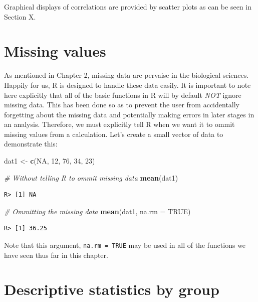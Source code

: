 \documentclass[english,10pt,a4paper,oneside]{book}
\newenvironment{Shaded}{\begin{snugshade}}{\end{snugshade}}
\newcommand{\CommentTok}[1]{\textcolor[rgb]{0.56,0.35,0.01}{\textit{#1}}}
\newcommand{\DataTypeTok}[1]{\textcolor[rgb]{0.13,0.29,0.53}{#1}}
\newcommand{\DecValTok}[1]{\textcolor[rgb]{0.00,0.00,0.81}{#1}}
\newcommand{\KeywordTok}[1]{\textcolor[rgb]{0.13,0.29,0.53}{\textbf{#1}}}
\newcommand{\NormalTok}[1]{#1}
\newcommand{\OtherTok}[1]{\textcolor[rgb]{0.56,0.35,0.01}{#1}}
\newcommand{\StringTok}[1]{\textcolor[rgb]{0.31,0.60,0.02}{#1}}
\theoremstyle{definition}
\theoremstyle{definition}
\theoremstyle{definition}
\theoremstyle{remark}
\begin{document}
Graphical displays of correlations are provided by scatter plots as can
be seen in Section X.

\hypertarget{missing-values-1}{%
\section{Missing values}\label{missing-values-1}}

As mentioned in Chapter 2, missing data are pervaise in the biological
sciences. Happily for us, R is designed to handle these data easily. It
is important to note here explicitly that all of the basic functions in
R will by default \emph{NOT} ignore missing data. This has been done so
as to prevent the user from accidentally forgetting about the missing
data and potentially making errors in later stages in an analysis.
Therefore, we must explicitly tell R when we want it to ommit missing
values from a calculation. Let's create a small vector of data to
demonstrate this:

\begin{Shaded}
\begin{Highlighting}[]
\NormalTok{dat1 <-}\StringTok{ }\KeywordTok{c}\NormalTok{(}\OtherTok{NA}\NormalTok{, }\DecValTok{12}\NormalTok{, }\DecValTok{76}\NormalTok{, }\DecValTok{34}\NormalTok{, }\DecValTok{23}\NormalTok{)}

\CommentTok{# Without telling R to ommit missing data}
\KeywordTok{mean}\NormalTok{(dat1)}
\end{Highlighting}
\end{Shaded}

\begin{verbatim}
R> [1] NA
\end{verbatim}

\begin{Shaded}
\begin{Highlighting}[]
\CommentTok{# Ommitting the missing data}
\KeywordTok{mean}\NormalTok{(dat1, }\DataTypeTok{na.rm =} \OtherTok{TRUE}\NormalTok{)}
\end{Highlighting}
\end{Shaded}

\begin{verbatim}
R> [1] 36.25
\end{verbatim}

Note that this argument, \texttt{na.rm\ =\ TRUE} may be used in all of
the functions we have seen thus far in this chapter.

\hypertarget{descriptive-statistics-by-group}{%
\section{Descriptive statistics by
group}\label{descriptive-statistics-by-group}}
\end{document}
